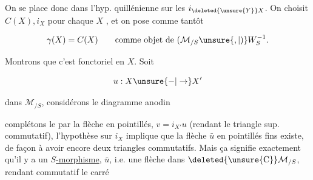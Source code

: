
 On se place donc dans l'hyp. quillénienne sur les $i_{\deleted{\unsure{Y}}X}$. On choisit $C(X),i_X$ pour chaque $X$ , et on pose comme tantôt

\[
\gamma(X)=C(X)\qquad\text{comme objet de }(\mathcal M_{/S}\unsure{,|)}W_S^{-1}.
\]

Montrons que c'est fonctoriel en $X$. Soit

\[
u:X\unsure{-|\to}X'
\]

dans $\mathcal M_{/S}$, considérons le diagramme anodin 



complétons le par la flèche en  pointillés, $v=i_{X'}u$ (rendant le triangle sup. commutatif), l'hypothèse sur $i_X$ implique que la flèche $\bar u$ en pointillés fins existe, de façon à avoir encore deux triangles commutatifs. Mais ça signifie exactement qu'il y a un \uline{$S$-morphisme}, $\bar u$, i.e. une flèche dans $\deleted{\unsure{\mathrm C}}\mathcal M_{/S}$, rendant commutatif le carré

